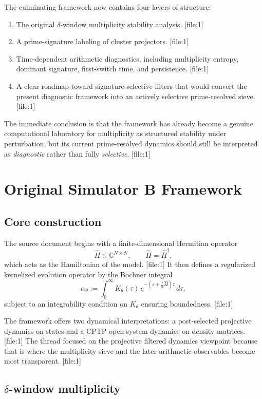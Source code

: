 \documentclass[11pt]{article}
\begin{document}
The culminating framework now contains four layers of structure:
\begin{enumerate}
    \item The original $\delta$-window multiplicity stability analysis. [file:1]
    \item A prime-signature labeling of cluster projectors. [file:1]
    \item Time-dependent arithmetic diagnostics, including multiplicity entropy, dominant signature, first-switch time, and persistence. [file:1]
    \item A clear roadmap toward signature-selective filters that would convert the present diagnostic framework into an actively selective prime-resolved sieve. [file:1]
\end{enumerate}

The immediate conclusion is that the framework has already become a genuine computational laboratory for multiplicity as structured stability under perturbation, but its current prime-resolved dynamics should still be interpreted as \emph{diagnostic} rather than fully \emph{selective}. [file:1]

\section{Original Simulator B Framework}

\subsection{Core construction}

The source document begins with a finite-dimensional Hermitian operator
\[
\widehat H \in \mathbb C^{N\times N}, \qquad \widehat H = \widehat H^{\dagger},
\]
which acts as the Hamiltonian of the model. [file:1] It then defines a regularized kernelized evolution operator by the Bochner integral
\[
\alpha_{\theta} := \int_0^{\infty} K_{\theta}(\tau)\, e^{-(\varepsilon + \tfrac{i}{\hbar}\widehat H)\tau}\, d\tau,
\]
subject to an integrability condition on $K_{\theta}$ ensuring boundedness. [file:1]

The framework offers two dynamical interpretations: a post-selected projective dynamics on states and a CPTP open-system dynamics on density matrices. [file:1] The thread focused on the projective filtered dynamics viewpoint because that is where the multiplicity sieve and the later arithmetic observables become most transparent. [file:1]

\subsection{$\delta$-window multiplicity}
\end{document}
